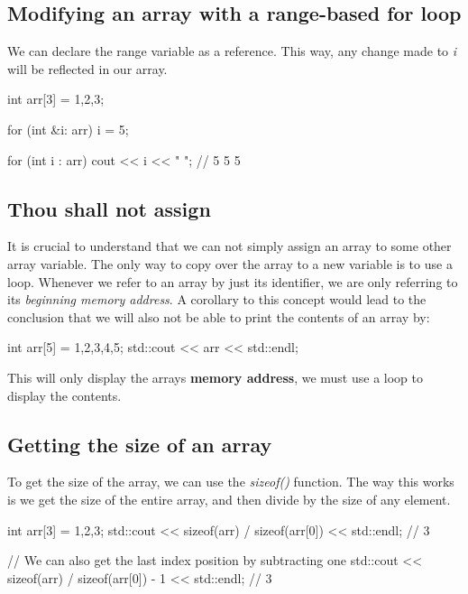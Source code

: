 \documentclass{report}
\begin{document}
   \subsection{Modifying an array with a range-based for loop}
   \bigbreak \noindent 
   We can declare the range variable as a reference. This way, any change made to \textit{i} will be reflected in our array.
   \bigbreak \noindent 
   
   \begin{cppcode}
int arr[3] = {1,2,3};

for (int &i: arr)  {
    i = 5;
}

for (int i : arr) cout << i << " "; // 5 5 5
   \end{cppcode}
   

   \bigbreak \noindent 
   \subsection{Thou shall not assign}
   \bigbreak \noindent 
   It is crucial to understand  that we can not simply assign an array to some other array variable. The only way to copy over the array to a new variable is to use a loop. Whenever we refer to an array by just its identifier, we are only referring to its \textit{beginning memory address}.
   \bigbreak \noindent 
   A corollary to this concept would lead to the conclusion that we will also not be able to print the contents of an array by:
   \bigbreak \noindent 
   
   \begin{cppcode}
int arr[5] = {1,2,3,4,5};
std::cout << arr << std::endl;

   \end{cppcode}
   
   \bigbreak \noindent 
   This will only display the arrays \textbf{memory address}, we must use a loop to display the contents.

   \pagebreak
   \subsection{Getting the size of an array}
   \bigbreak \noindent 
   To get the size of the array, we can use the \textit{sizeof()} function. The way this works is we get the size of the entire array, and then divide by the size of any element.
   \bigbreak \noindent 
    
    \begin{cppcode}
int arr[3] = {1,2,3};
std::cout << sizeof(arr) / sizeof(arr[0]) << std::endl;  // 3

// We can also get the last index position by subtracting one
    std::cout << sizeof(arr) / sizeof(arr[0]) - 1 << std::endl;  // 3
    \end{cppcode}
    
\end{document}
